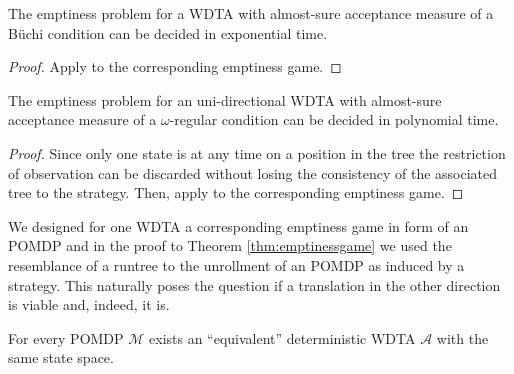 \begin{corollary}
  The emptiness problem for a \ac{WDTA} with almost-sure acceptance measure of
  a Büchi condition can be decided in exponential time.
  \label{cor:emptiness}
\end{corollary}
\begin{proof}
  Apply \cite[Theorem 5]{QualAnaPOMDP} to the corresponding emptiness game.
\end{proof}
\begin{corollary}
  The emptiness problem for an uni-directional \ac{WDTA} with almost-sure
  acceptance measure of a $\omega$-regular condition can be decided in
  polynomial time.
\end{corollary}
\begin{proof}
  Since only one state is at any time on a position in the tree the restriction
  of observation can be discarded without losing the consistency of the
  associated tree to the strategy. Then, apply
  \cite[Theorem 3]{RandAutoInfTrees} to the corresponding emptiness game.
\end{proof}
We designed for one \ac{WDTA} a corresponding emptiness game in form of an
\ac{POMDP} and in the proof to Theorem \ref{thm:emptinessgame} we used the
resemblance of a runtree to the unrollment of an \ac{POMDP} as induced by a
strategy. This naturally poses the question if a translation in the other
direction is viable and, indeed, it is.
\begin{theorem}
  \label{thm:POMDPequivWDTA}
  For every \ac{POMDP} $\mathcal{M}$ exists an \enquote{equivalent}
  deterministic \ac{WDTA} $\mathcal{A}$ with the same state space.
\end{theorem}
